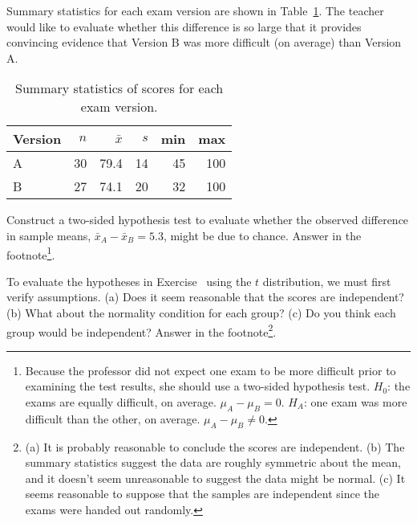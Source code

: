 Summary statistics for each exam version are shown in Table~\ref{summaryStatsForTwoVersionsOfExams}. The teacher would like to evaluate whether this difference is so large that it provides convincing evidence that Version B was more difficult (on average) than Version A. 
\begin{table}[hht]
\centering
\begin{tabular}{l rrrrr}
\hline
Version\hspace{2mm}	& $n$	& $\bar{x}$	& $s$	& min	& max  \\
\hline
A		& 30		& 79.4		& 14 	& 45		& 100 \\
B		& 27		& 74.1		& 20		& 32		& 100 \\
\hline
\end{tabular}
\caption{Summary statistics of scores for each exam version.}
\label{summaryStatsForTwoVersionsOfExams}
\end{table}

\begin{exercise} \label{htSetupForEvaluatingTwoExamVersions}
Construct a two-sided hypothesis test to evaluate whether the observed difference in sample means, $\bar{x}_A - \bar{x}_B=5.3$, might be due to chance. Answer in the footnote\footnote{Because the professor did not expect one exam to be more difficult prior to examining the test results, she should use a two-sided hypothesis test. $H_0$: the exams are equally difficult, on average. $\mu_A - \mu_B = 0$. $H_A$: one exam was more difficult than the other, on average. $\mu_A - \mu_B \neq 0$.}.
\end{exercise}

\begin{exercise} \label{conditionsForTDistForEvaluatingTwoExamVersions}
To evaluate the hypotheses in Exercise~ using the $t$ distribution, we must first verify assumptions. (a) Does it seem reasonable that the scores are independent? (b) What about the normality condition for each group? (c) Do you think each group would be independent? Answer in the footnote\footnote{(a) It is probably reasonable to conclude the scores are independent. (b) The summary statistics suggest the data are roughly symmetric about the mean, and it doesn't seem unreasonable to suggest the data might be normal. (c) It seems reasonable to suppose that the samples are independent since the exams were handed out randomly.}.
\end{exercise}

